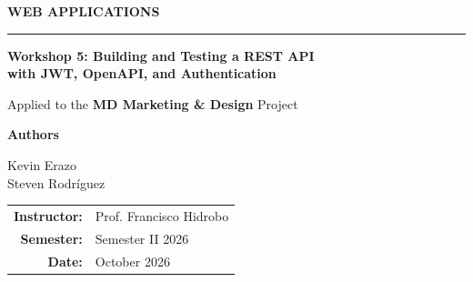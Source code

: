 \documentclass[11pt,a4paper]{article}
\begin{document}

\begin{titlepage}
\thispagestyle{empty}
\centering

\vspace*{1.4cm}

{\Large
\color{textgray}
\textbf{WEB APPLICATIONS}
\par}

\vspace{0.35cm}

{\color{accent}
\rule{0.82\textwidth}{1.2pt}
\par}

\vspace{1.25cm}

{\fontsize{25}{31}\selectfont
\textbf{
Workshop 5: Building and Testing a REST API\\
with JWT, OpenAPI, and Authentication
}
\par}

\vspace{0.9cm}

{\large
\color{textgray}
Applied to the \textbf{MD Marketing \& Design} Project
\par}

\vspace{1.6cm}

{\large
\textbf{Authors}
\par}

\vspace{0.4cm}

{\Large
Kevin Erazo\\[0.18cm]
Steven Rodríguez
\par}

\vspace{1.25cm}

\begin{minipage}{0.62\textwidth}
\centering

\renewcommand{\arraystretch}{1.5}

\begin{tabular}{>{\bfseries}r l}
Instructor: & Prof. Francisco Hidrobo \\
Semester:   & Semester II 2026 \\
Date:       & October 2026 \\
\end{tabular}


\end{minipage}
\end{titlepage}
\end{document}
